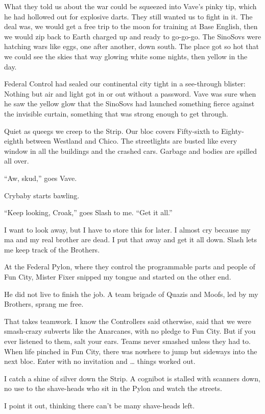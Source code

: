 What they told us about the war could be squeezed into Vave's pinky tip, which he had hollowed out for explosive darts. They still wanted us to fight in it. The deal was, we would get a free trip to the moon for training at Base English, then we would zip back to Earth charged up and ready to go-go-go. The SinoSovs were hatching wars like eggs, one after another, down south. The place got so hot that we could see the skies that way glowing white some nights, then yellow in the day.

Federal Control had sealed our continental city tight in a see-through blister: Nothing but air and light got in or out without a password. Vave was sure when he saw the yellow glow that the SinoSovs had launched something fierce against the invisible curtain, something that was strong enough to get through.

Quiet as queegs we creep to the Strip. Our bloc covers Fifty-sixth to Eighty-eighth between Westland and Chico. The streetlights are busted like every window in all the buildings and the crashed cars. Garbage and bodies are spilled all over.

“Aw, skud,” goes Vave.

Crybaby starts bawling.

“Keep looking, Croak,” goes Slash to me. “Get it all.”

I want to look away, but I have to store this for later. I almost cry because my ma and my real brother are dead. I put that away and get it all down. Slash lets me keep track of the Brothers.

At the Federal Pylon, where they control the programmable parts and people of Fun City, Mister Fixer snipped my tongue and started on the other end.

He did not live to finish the job. A team brigade of Quazis and Moofs, led by my Brothers, sprang me free.

That takes teamwork. I know the Controllers said otherwise, said that we were smash-crazy subverts like the Anarcanes, with no pledge to Fun City. But if you ever listened to them, salt your ears. Teams never smashed unless they had to. When life pinched in Fun City, there was nowhere to jump but sideways into the next bloc. Enter with no invitation and … things worked out.

I catch a shine of silver down the Strip. A cognibot is stalled with scanners down, no use to the shave-heads who sit in the Pylon and watch the streets.

I point it out, thinking there can't be many shave-heads left.

